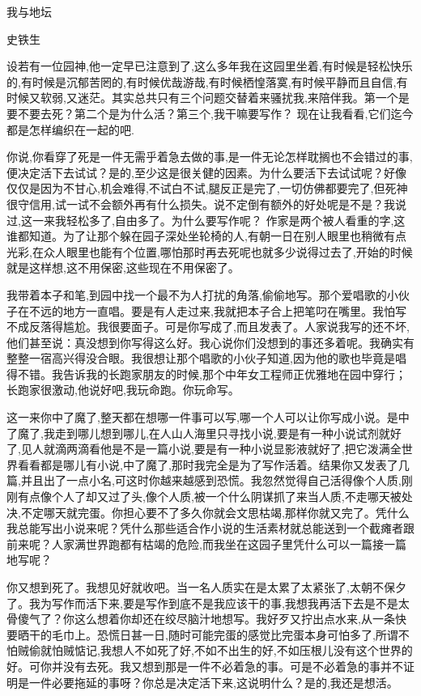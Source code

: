 \documentclass{ctexart}
\newcommand{\nm}{\normalsize}
\renewcommand{\\}{\par}
\begin{document}
\nm \fangsong 
\\\centerline{我与地坛}\\\centerline{史铁生}
\\设若有一位园神,他一定早已注意到了,这么多年我在这园里坐着,有时候是轻松快乐的,有时候是沉郁苦罔的,有时候优哉游哉,有时候栖惶落寞,有时候平静而且自信,有时候又软弱,又迷茫。其实总共只有三个问题交替着来骚扰我,来陪伴我。第一个是要不要去死？第二个是为什么活？第三个,我干嘛要写作？ 现在让我看看,它们迄今都是怎样编织在一起的吧.
\\你说,你看穿了死是一件无需乎着急去做的事,是一件无论怎样耽搁也不会错过的事,便决定活下去试试？是的,至少这是很关健的因素。为什么要活下去试试呢？好像仅仅是因为不甘心,机会难得,不试白不试,腿反正是完了,一切仿佛都要完了,但死神很守信用,试一试不会额外再有什么损失。说不定倒有额外的好处呢是不是？我说过,这一来我轻松多了,自由多了。为什么要写作呢？ 作家是两个被人看重的字,这谁都知道。为了让那个躲在园子深处坐轮椅的人,有朝一日在别人眼里也稍微有点光彩,在众人眼里也能有个位置,哪怕那时再去死呢也就多少说得过去了,开始的时候就是这样想,这不用保密,这些现在不用保密了。 
\\我带着本子和笔,到园中找一个最不为人打扰的角落,偷偷地写。那个爱唱歌的小伙子在不远的地方一直唱。要是有人走过来,我就把本子合上把笔叼在嘴里。我怕写不成反落得尴尬。我很要面子。可是你写成了,而且发表了。人家说我写的还不坏,他们甚至说：真没想到你写得这么好。我心说你们没想到的事还多着呢。我确实有整整一宿高兴得没合眼。我很想让那个唱歌的小伙子知道,因为他的歌也毕竟是唱得不错。我告诉我的长跑家朋友的时候,那个中年女工程师正优雅地在园中穿行；长跑家很激动,他说好吧,我玩命跑。你玩命写。
\\这一来你中了魔了,整天都在想哪一件事可以写,哪一个人可以让你写成小说。是中了魔了,我走到哪儿想到哪儿,在人山人海里只寻找小说,要是有一种小说试剂就好了,见人就滴两滴看他是不是一篇小说,要是有一种小说显影液就好了,把它泼满全世界看看都是哪儿有小说,中了魔了,那时我完全是为了写作活着。结果你又发表了几篇,并且出了一点小名,可这时你越来越感到恐慌。我忽然觉得自己活得像个人质,刚刚有点像个人了却又过了头,像个人质,被一个什么阴谋抓了来当人质,不走哪天被处决,不定哪天就完蛋。你担心要不了多久你就会文思枯竭,那样你就又完了。凭什么我总能写出小说来呢？凭什么那些适合作小说的生活素材就总能送到一个截瘫者跟前来呢？人家满世界跑都有枯竭的危险,而我坐在这园子里凭什么可以一篇接一篇地写呢？
\\你又想到死了。我想见好就收吧。当一名人质实在是太累了太紧张了,太朝不保夕了。我为写作而活下来,要是写作到底不是我应该干的事,我想我再活下去是不是太骨傻气了？你这么想着你却还在绞尽脑汁地想写。我好歹又拧出点水来,从一条快要晒干的毛巾上。恐慌日甚一日,随时可能完蛋的感觉比完蛋本身可怕多了,所谓不怕贼偷就怕贼惦记,我想人不如死了好,不如不出生的好,不如压根儿没有这个世界的好。可你并没有去死。我又想到那是一件不必着急的事。可是不必着急的事并不证明是一件必要拖延的事呀？你总是决定活下来,这说明什么？是的,我还是想活。
\end{document}
